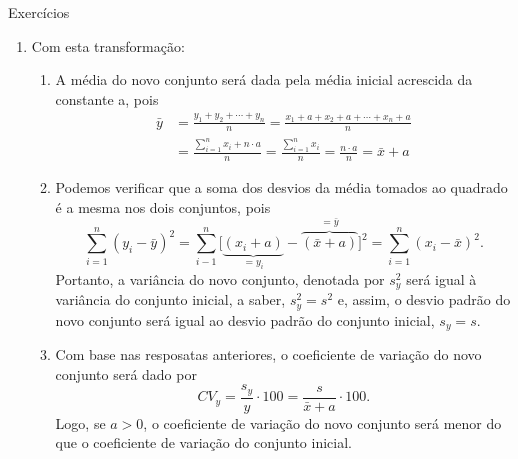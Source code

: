 {{{\begin{answer}{Exercícios}
{\begin{enumerate}
\begin{enumerate}
  \item Por exemplo, pode-se ter no grupo 51 recrutas com $1{,}81$ m, exatamente um com $1{,}80$ m e exatamente um com $1{,}82$ m, o que tornaria a sentença a falsa. No entanto, também pode-se ter 49 recrutas com 1{,}81 m, dois com $1{,}80$ m e dois com $1{,}82$ m, o que tornaria a sentença verdadeira. Portanto, os dados são insuficientes para uma conclusão.
  \end{enumerate}
  \item Com esta transformação:
  \begin{enumerate}
  \item A média do novo conjunto será dada pela média inicial acrescida da constante a, pois
  \begin{align*}
  \bar{y}&=\frac{y_1+y_2+\cdots+y_n}{n}=\frac{x_1+a+x_2+a+\cdots+x_n+a}{n}\\
  &=\frac{\sum_{i=1}^{n}x_i+n\cdot a}{n}=\frac{\sum^n_{i=1}x_i}{n}=\frac{n\cdot a}{n}=\bar{x}+a
  \end{align*}
  \item Podemos verificar que a soma dos desvios da média tomados ao quadrado é a mesma nos dois conjuntos, pois
  \begin{equation*}
  \sum^n_{i=1}(y_i-\bar{y})^2=\sum^n_{i-1}\big[\underbrace{(x_i+a)}_{=y_i}-\overbrace{(\bar{x}+a)}^{=\bar{y}}\big]^2=\sum^n_{i=1}(x_i-\bar{x})^2.
  \end{equation*}
  Portanto, a variância do novo conjunto, denotada por $s^2_y$ será igual à variância do conjunto inicial, a saber, $s^2_y=s^2$ e, assim, o desvio padrão do novo conjunto será igual ao desvio padrão do conjunto inicial, $s_y=s$.
  \item Com base nas resposatas anteriores, o coeficiente de variação do novo conjunto será dado por 
  \begin{equation*}
  CV_y=\frac{s_y}{y}\cdot100=\frac{s}{\bar{x}+a}\cdot100.
  \end{equation*}
  Logo, se $a>0$, o coeficiente de variação do novo conjunto será menor do que o coeficiente de variação do conjunto inicial. 


\end{enumerate}
\end{enumerate}}
\end{answer}}}}
